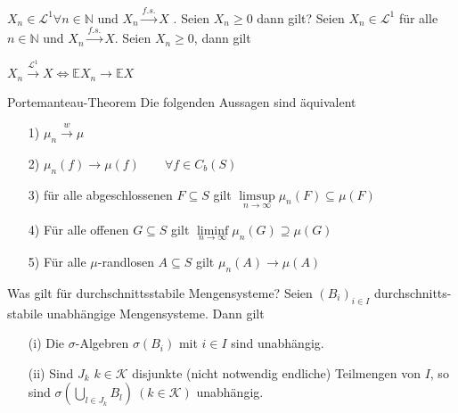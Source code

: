 \documentclass[avery5371,grid,frame]{flashcards} %
\newcommand{\E}{\mathbb{E}}
\newcommand{\N}{\mathbb{N}}
\newcommand{\1}{ \mathbb{1} } %
\begin{document}
\begin{flashcard}[Satz]{$X_n \in \mathcal{L}^1 \forall n\in \mathbb{N}$  und $X_n \overset{f.s.}{\to} X$ . Seien $X_n \geq 0$ dann gilt?}
  Seien $X_n \in \mathcal{L}^1$ für alle $n \in \N$ und $X_n
  \overset{f.s.}{\to} X$. Seien $X_n\geq 0$, dann gilt
  \begin{center}
    $X_n \overset{\mathcal{L}^1}{\to} X \Leftrightarrow \E X_n \to \E
    X$
  \end{center}
\end{flashcard}

\begin{flashcard}[Satz]{Portemanteau-Theorem}
\small
  Die folgenden Aussagen sind äquivalent
  \begin{itemize}
  \item[1)] $\mu_n \overset{w}{\to} \mu$
  \item[2)] $\mu_n(f) \to \mu(f) \qquad \forall f \in C_b(S)$
  \item[3)] für alle abgeschlossenen $F \subseteq S$ gilt
      $\limsup\limits_{n \to \infty} \mu_n(F) \subseteq \mu(F)$
  \item[4)] Für alle offenen $G \subseteq S$ gilt
      $\liminf\limits_{n \to \infty}\mu_n(G) \supseteq \mu(G)$
  \item[5)] Für alle $\mu$-randlosen $A \subseteq S$ gilt
      $\mu_n(A) \to \mu(A)$
  \end{itemize}
\end{flashcard}

\begin{flashcard}[Satz]{Was gilt für durchschnittsstabile Mengensysteme?}
  Seien $\left(B_{i}\right)_{i\in I}$ durchschnitts-stabile unabhängige
  Mengensysteme. Dann gilt
  \begin{itemize}
  \item [{(i)}] Die $\sigma$-Algebren $\sigma\left(B_{i}\right)$ mit $i\in I$
    sind unabhängig.
  \item [{(ii)}] Sind $J_{k}$ $k\in\mathcal{K}$ disjunkte (nicht notwendig
    endliche) Teilmengen von $I$, so sind
$    \sigma\left(\bigcup_{l\in J_{k}}B_{l}\right)\ \left(k\in\mathcal{K}\right)$
     unabhängig. \label{s1.2(ii)}
  \end{itemize}
\end{flashcard}
\end{document}

